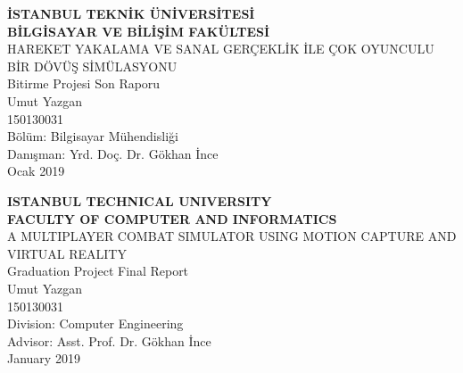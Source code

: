 \documentclass[a4paper, 12pt, titlepage]{article}
\title{\thetitle}
\author{\theauthor}
\date{\thedate}
\newcommand{\thetitle}{A MULTIPLAYER COMBAT SIMULATOR USING MOTION CAPTURE AND VIRTUAL REALITY}
\newcommand{\theturkishtitle}{HAREKET YAKALAMA VE SANAL GERÇEKLİK İLE ÇOK OYUNCULU BİR DÖVÜŞ
                              SİMÜLASYONU}
\newcommand{\theauthor}{Umut Yazgan}
\newcommand{\thedate}{January 2019}
\newcommand{\theturkishdate}{Ocak 2019}
\begin{document}
\shorthandoff{=}


\begin{titlepage}
    \bfseries %
    \sffamily %
    \begin{center}
        \LARGE{\textbf{İSTANBUL TEKNİK ÜNİVERSİTESİ \\ 
               BİLGİSAYAR VE BİLİŞİM FAKÜLTESİ} } \\
        \vspace{5.5cm}
        \LARGE{\theturkishtitle}  \\
        \vspace{3.5cm}
        \Large{Bitirme Projesi Son Raporu} \\
        \vspace{0.5cm}
        \Large{\theauthor} \\
        \Large{150130031} \\
        \vspace{3.75cm}
        \large{Bölüm: Bilgisayar Mühendisliği } \\
        \vspace{1cm}
        \large{Danışman: Yrd. Doç. Dr. Gökhan İnce} \\
        \vspace{\fill} %
        \large{\normalfont \sffamily \theturkishdate}
    \end{center}
\end{titlepage}

\begin{titlepage}
    \bfseries %
    \sffamily %
    \begin{center}
        \LARGE{\textbf{ISTANBUL TECHNICAL UNIVERSITY \\ 
               FACULTY OF COMPUTER AND INFORMATICS} } \\
        \vspace{5.5cm}
        \LARGE{\thetitle}  \\
        \vspace{3.5cm}
        \Large{Graduation Project Final Report} \\
        \vspace{0.5cm}
        \Large{\theauthor} \\
        \Large{150130031} \\
        \vspace{3.75cm}
        \large{Division: Computer Engineering} \\
        \vspace{1cm}
        \large{Advisor: Asst. Prof. Dr. Gökhan İnce} \\
        \vspace{\fill} %
        \large{\normalfont \sffamily \thedate}
    \end{center}
\end{titlepage}
\end{document}
